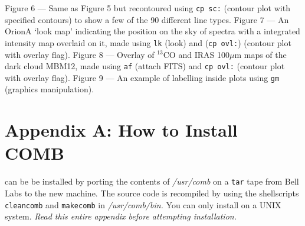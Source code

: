 \vspace*{\fill}
\fig Figure 6 --- Same as Figure 5 but recontoured using {\tt cp sc:}
	(contour plot with specified contours) to show a few of the 90 different
        line types.
\newpage
\vspace*{\fill}
\fig Figure 7 --- An OrionA `look map' indicating the position on the sky of 
                 spectra with a integrated intensity map
                 overlaid on it, made using {\tt lk} (look) and ({\tt cp ovl:})
		 (contour plot with overlay flag).
\newpage
\vspace*{\fill}
\fig Figure 8 --- Overlay of $^{13}$CO and IRAS 100$\mu$m maps of the dark
		 cloud MBM12, made using {\tt af} (attach FITS) and {\tt cp ovl:} 
                 (contour plot with overlay flag).
\newpage
\vspace*{\fill}
\fig Figure 9 --- An example of labelling inside plots using {\tt gm} (graphics
		 manipulation).
\newpage

\section*{Appendix A: How to Install COMB}
\label{app-inst}

\COMB can be be installed by porting the contents of {\sl /usr/comb\/} 
on a {\tt tar} tape from Bell Labs to the new machine.  
The source code is recompiled by using the shellscripts {\tt cleancomb} and 
{\tt makecomb} in {\sl /usr/comb/bin.}  
You can only install \COMB on a UNIX system. {\it Read this entire appendix
before attempting installation.}
 
